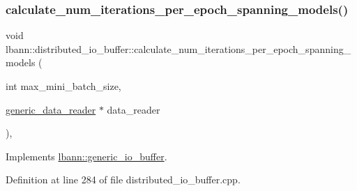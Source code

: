\subsubsection{\texorpdfstring{calculate\+\_\+num\+\_\+iterations\+\_\+per\+\_\+epoch\+\_\+spanning\+\_\+models()}{calculate\_num\_iterations\_per\_epoch\_spanning\_models()}}
{\footnotesize\ttfamily void lbann\+::distributed\+\_\+io\+\_\+buffer\+::calculate\+\_\+num\+\_\+iterations\+\_\+per\+\_\+epoch\+\_\+spanning\+\_\+models (\begin{DoxyParamCaption}\item[{int}]{max\+\_\+mini\+\_\+batch\+\_\+size,  }\item[{\hyperlink{classlbann_1_1generic__data__reader}{generic\+\_\+data\+\_\+reader} $\ast$}]{data\+\_\+reader }\end{DoxyParamCaption})\hspace{0.3cm}{\ttfamily [override]}, {\ttfamily [virtual]}}



Implements \hyperlink{classlbann_1_1generic__io__buffer_ac943184cf364f7922648e3acb760b41e}{lbann\+::generic\+\_\+io\+\_\+buffer}.



Definition at line 284 of file distributed\+\_\+io\+\_\+buffer.\+cpp.


